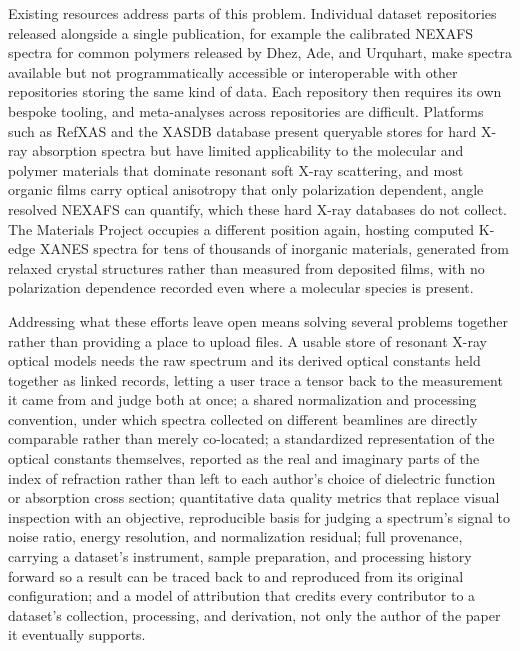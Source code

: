 Existing resources address parts of this problem. Individual dataset repositories released alongside a single publication, for example the calibrated NEXAFS spectra for common polymers released by Dhez, Ade, and Urquhart,\autocite{dhezCalibratedNEXAFSSpectra2003} make spectra available but not programmatically accessible or interoperable with other repositories storing the same kind of data. Each repository then requires its own bespoke tooling, and meta-analyses across repositories are difficult. Platforms such as RefXAS\autocite{paripsaRefXASOpenAccess2024} and the XASDB\autocite{chenDatabaseInitioLedge2021} database present queryable stores for hard X-ray absorption spectra but have limited applicability to the molecular and polymer materials that dominate resonant soft X-ray scattering, and most organic films carry optical anisotropy that only polarization dependent, angle resolved NEXAFS can quantify, which these hard X-ray databases do not collect. The Materials Project\autocite{hortonAcceleratedDatadrivenMaterials2025} occupies a different position again, hosting computed K-edge XANES spectra for tens of thousands of inorganic materials, generated from relaxed crystal structures rather than measured from deposited films, with no polarization dependence recorded even where a molecular species is present.

Addressing what these efforts leave open means solving several problems together rather than providing a place to upload files. A usable store of resonant X-ray optical models needs the raw spectrum and its derived optical constants held together as linked records, letting a user trace a tensor back to the measurement it came from and judge both at once; a shared normalization and processing convention, under which spectra collected on different beamlines are directly comparable rather than merely co-located; a standardized representation of the optical constants themselves, reported as the real and imaginary parts of the index of refraction rather than left to each author's choice of dielectric function or absorption cross section; quantitative data quality metrics that replace visual inspection with an objective, reproducible basis for judging a spectrum's signal to noise ratio, energy resolution, and normalization residual; full provenance, carrying a dataset's instrument, sample preparation, and processing history forward so a result can be traced back to and reproduced from its original configuration; and a model of attribution that credits every contributor to a dataset's collection, processing, and derivation, not only the author of the paper it eventually supports.

